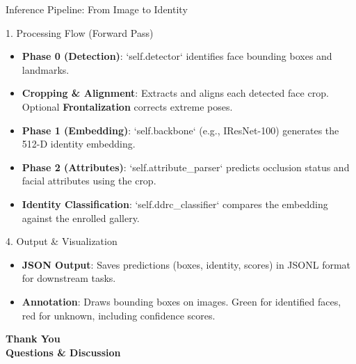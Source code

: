 \documentclass[t]{beamer}
\begin{document}
\begin{frame}[allowframebreaks]{Inference Pipeline: From Image to Identity}


    \begin{block}{1. Processing Flow (Forward Pass)}
        \begin{itemize}
            \item \textbf{Phase 0 (Detection)}: `self.detector` identifies face bounding boxes and landmarks.
            \item \textbf{Cropping & Alignment}: Extracts and aligns each detected face crop. Optional \textbf{Frontalization} corrects extreme poses.
            \item \textbf{Phase 1 (Embedding)}: `self.backbone` (e.g., IResNet-100) generates the 512-D identity embedding.
            \item \textbf{Phase 2 (Attributes)}: `self.attribute\_parser` predicts occlusion status and facial attributes using the crop.
            \item \textbf{Identity Classification}: `self.ddrc\_classifier` compares the embedding against the enrolled gallery.
        \end{itemize}
    \end{block}

    \begin{block}{4. Output \& Visualization}
        \begin{itemize}
            \item \textbf{JSON Output}: Saves predictions (boxes, identity, scores) in JSONL format for downstream tasks.
            \item \textbf{Annotation}: Draws bounding boxes on images. Green for identified faces, red for unknown, including confidence scores.
        \end{itemize}
    \end{block}
\end{frame}


\begin{frame}
    \centering
    \vfill
    \Huge \textcolor{MyOrange}{\textbf{Thank You}} \\
    \vspace{0.5cm}
    \Large \textbf{Questions \& Discussion}
    \vfill
\end{frame}
\end{document}
